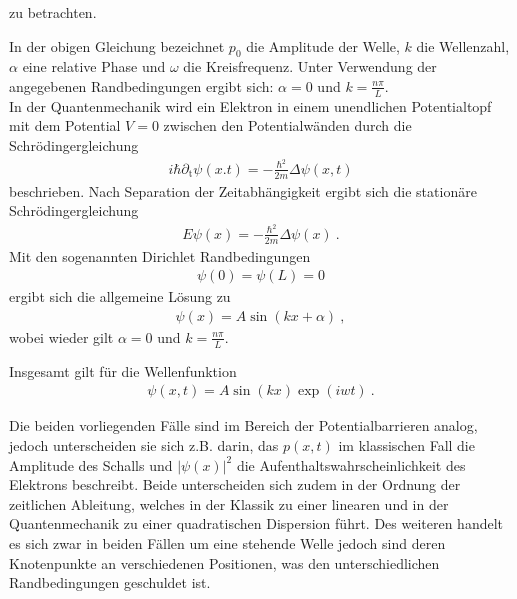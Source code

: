 zu betrachten.


In der obigen Gleichung bezeichnet $p_0$ die Amplitude der Welle, $k$ die Wellenzahl, $\alpha$ eine relative Phase und $\omega$ die Kreisfrequenz.
Unter Verwendung der angegebenen Randbedingungen ergibt sich: $\alpha=0$ und $k=\frac{n\pi}{L}$.
\\

In der Quantenmechanik wird ein Elektron in einem unendlichen Potentialtopf mit dem Potential $V=0$ zwischen den Potentialwänden durch die Schrödingergleichung
\begin{align}
  i\hbar \partial_\textrm{t} \psi(x.t) = -\frac{\hbar^2}{2m} \Delta \psi(x,t)
  \label{eq:SG}
\end{align}
beschrieben. Nach Separation der Zeitabhängigkeit ergibt sich die stationäre Schrödingergleichung
\begin{align}
  E\psi(x) = -\frac{\hbar^2}{2m} \Delta \psi(x)\: .
  \label{eq:statSG}
\end{align}
Mit den sogenannten Dirichlet Randbedingungen
\begin{align}
\psi(0)=\psi(L)=0
\label{eq:QMRandbedingungen}
\end{align}
ergibt sich die allgemeine Lösung zu
\begin{align}
  \psi(x)= A\sin{(kx + \alpha)}\:,
  \label{eq:QMlsg}
\end{align}
wobei wieder gilt $\alpha=0$ und $k=\frac{n\pi}{L}$.

Insgesamt gilt für die Wellenfunktion
\begin{align}
  \psi(x,t) = A\sin{(kx)}\exp{(iwt)} \:.
  \label{eq:allgqmlsg}
\end{align}


Die beiden vorliegenden Fälle sind im Bereich der Potentialbarrieren analog, jedoch unterscheiden sie sich z.B. darin, das $p(x,t)$ im klassischen Fall die Amplitude des Schalls und $|\psi(x)|^2$ die Aufenthaltswahrscheinlichkeit des Elektrons beschreibt. Beide unterscheiden sich zudem in der Ordnung der zeitlichen Ableitung, welches in der Klassik zu einer linearen und in der Quantenmechanik zu einer quadratischen Dispersion führt. Des weiteren handelt es sich zwar in beiden Fällen um eine stehende Welle jedoch sind deren Knotenpunkte an verschiedenen Positionen, was den unterschiedlichen Randbedingungen geschuldet ist.


